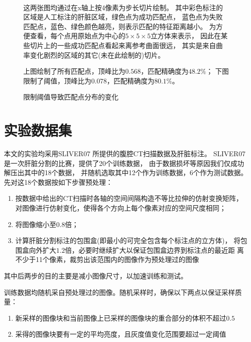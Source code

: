 \begin{figure}[h!]
    {
         \\
        \vspace{0.2em}
        \caption{限制阈值导致匹配点分布的变化}
        \label{fig:expr:match}
    }
    \footnotesize
    这两张图均通过在x轴上按4像素为步长切片绘制。
    其中彩色标注的区域是人工标注的肝脏区域，绿色点为成功匹配点，
    蓝色点为失败匹配点，蓝色、绿色颜色越亮，则表示匹配的特征距离越小。
    为方便查看，每个点用原始点为中心的$5\times 5 \times 5$立方体来表示，
    因此在某些切片上的一些成功匹配点看起来离参考曲面很远，
    其实是来自曲率变化剧烈的区域的其它(未在此绘制的)切片。

    上图绘制了所有匹配点，顶峰比为$0.568$，匹配精确度为$48.2\%$；
    下图限制了阈值，顶峰比为$0.078$，匹配精确度为$80.1\%$。
\end{figure}


\section{实验数据集}
本文的实验均采用SLIVER07\cite{heimann2009comparison}
所提供的腹腔CT扫描数据及肝脏标注。
SLIVER07是一次肝脏分割的比赛，提供了20个训练数据，
由于数据损坏等原因我们仅成功解压出其中的18个数据，
并随机选取其中12个作为训练数据，6个作为测试数据。
先对这18个数据按如下步骤预处理：
\begin{enumerate}
    \item 按数据中给出的CT扫描时各轴的空间间隔构造不等比拉伸的仿射变换矩阵，
        对图像进行仿射变化，使得各个方向上每个像素对应的空间尺度相同；
    \item 将图像缩小至$0.8$倍；
    \item 计算肝脏分割标注的包围盒(即最小的可完全包含每个标注点的立方体)，
        将包围盒向外扩大$1.2$倍，必要时继续扩大以保证包围盒边界到标注点的最近距
        离不少于11个像素，裁剪出该范围内的图像作为预处理过的图像
\end{enumerate}
其中后两步的目的主要是减小图像尺寸，以加速训练和测试。

训练数据均随机采自预处理过的图像。随机采样时，确保以下两点以保证采样质量：
\begin{enumerate}
    \item 新采样的图像块和当前图像上已采样的图像块的重合部分的体积不超过$0.5$
    \item 采得的图像块要有一定的平均亮度，且灰度值变化范围要超过一定阈值
\end{enumerate}

